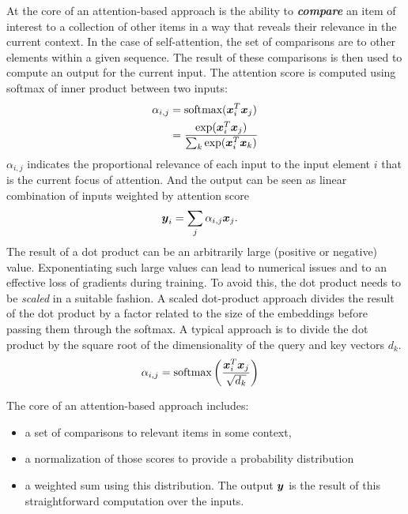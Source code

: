 \documentclass[11pt]{article}
\begin{document}
At the core of an attention-based approach is the ability to \textbf{\emph{compare}} an item of interest to a collection of other items in a way that reveals their relevance in the current context. In the case of self-attention, the set of comparisons are to other elements within a given sequence. The result of these comparisons is then used to
compute an output for the current input. The attention score is computed using softmax of inner product between two inputs:
\begin{align*}
\alpha_{i,j}&= \text{softmax}(\boldsymbol{x}_{i}^{T}\boldsymbol{x}_{j})\nonumber\\
&= \frac{\exp(\boldsymbol{x}_{i}^{T}\boldsymbol{x}_{j})}{\sum_{k}\exp(\boldsymbol{x}_{i}^{T}\boldsymbol{x}_{k})}
\end{align*} $\alpha_{i, j}$ indicates the proportional relevance of each input to the input element $i$ that is the current focus of attention. And the output can be seen as linear combination of inputs weighted by attention score 
\begin{align*}
\boldsymbol{y}_{i} &= \sum_{j}\alpha_{i,j}\boldsymbol{x}_{j}.
\end{align*} The result of a dot product can be an arbitrarily large (positive or negative) value. Exponentiating such large values can lead to numerical issues and to an effective loss of gradients during training. To avoid this, the dot product needs to be \emph{scaled} in a suitable fashion. A scaled dot-product approach divides the result of the dot product by a factor related to the size of the embeddings before passing them through the softmax. A typical approach is to divide the dot product by the square root of the
dimensionality of the query and key vectors $d_{k}$. 
\begin{align*}
\alpha_{i,j}&= \text{softmax}\left(\frac{\boldsymbol{x}_{i}^{T}\boldsymbol{x}_{j}}{\sqrt{d_{k}}}\right)
\end{align*}



The core of an attention-based approach includes:
\begin{itemize}
\item a set of comparisons to relevant items in some context, 
\item a normalization of those scores to provide a probability distribution
\item a weighted sum using this distribution. The output $\boldsymbol{y}$ is the result of this straightforward computation over the inputs.
\end{itemize} 
\end{document}
